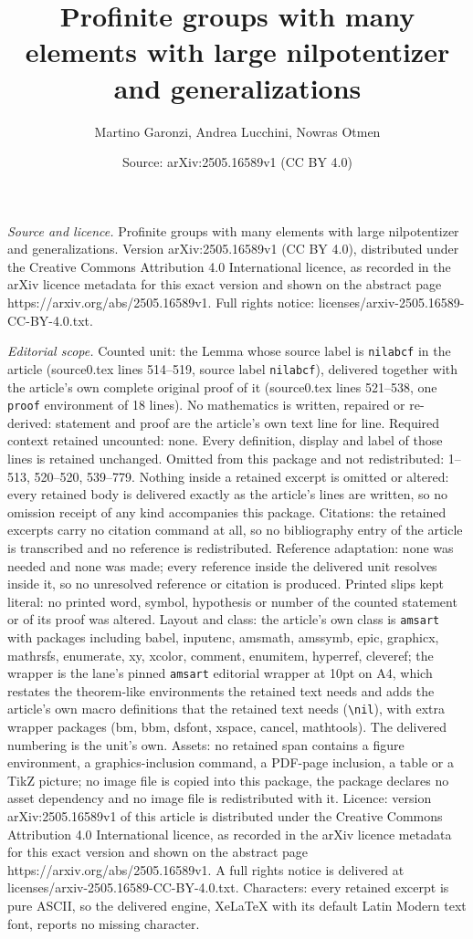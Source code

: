 \documentclass[10pt,a4paper]{amsart}
\title[Profinite groups with many elements with large nilpotentizer]{Profinite groups with many elements with large nilpotentizer and generalizations}
\author{Martino Garonzi, Andrea Lucchini, Nowras Otmen}
\date{Source: arXiv:2505.16589v1 (CC BY 4.0)}
\begin{document}
\maketitle

\noindent\emph{Source and licence.} Profinite groups with many elements with large nilpotentizer and generalizations. Version arXiv:2505.16589v1 (CC BY 4.0), distributed under the Creative Commons Attribution 4.0 International licence, as recorded in the arXiv licence metadata for this exact version and shown on the abstract page https://arxiv.org/abs/2505.16589v1. Full rights notice: licenses/arxiv-2505.16589-CC-BY-4.0.txt.\par\smallskip

\noindent\textit{Editorial scope.} Counted unit: the Lemma whose source label is \texttt{nilabcf} in the article (source0.tex lines 514--519, source label \texttt{nilabcf}), delivered together with the article's own complete original proof of it (source0.tex lines 521--538, one \texttt{proof} environment of 18 lines). No mathematics is written, repaired or re-derived: statement and proof are the article's own text line for line. Required context retained uncounted: none. Every definition, display and label of those lines is retained unchanged. Omitted from this package and not redistributed: 1--513, 520--520, 539--779. Nothing inside a retained excerpt is omitted or altered: every retained body is delivered exactly as the article's lines are written, so no omission receipt of any kind accompanies this package. Citations: the retained excerpts carry no citation command at all, so no bibliography entry of the article is transcribed and no reference is redistributed. Reference adaptation: none was needed and none was made; every reference inside the delivered unit resolves inside it, so no unresolved reference or citation is produced. Printed slips kept literal: no printed word, symbol, hypothesis or number of the counted statement or of its proof was altered. Layout and class: the article's own class is \texttt{amsart} with packages including babel, inputenc, amsmath, amssymb, epic, graphicx, mathrsfs, enumerate, xy, xcolor, comment, enumitem, hyperref, cleveref; the wrapper is the lane's pinned \texttt{amsart} editorial wrapper at 10pt on A4, which restates the theorem-like environments the retained text needs and adds the article's own macro definitions that the retained text needs (\texttt{\textbackslash nil}), with extra wrapper packages (bm, bbm, dsfont, xspace, cancel, mathtools). The delivered numbering is the unit's own. Assets: no retained span contains a figure environment, a graphics-inclusion command, a PDF-page inclusion, a table or a TikZ picture; no image file is copied into this package, the package declares no asset dependency and no image file is redistributed with it. Licence: version arXiv:2505.16589v1 of this article is distributed under the Creative Commons Attribution 4.0 International licence, as recorded in the arXiv licence metadata for this exact version and shown on the abstract page https://arxiv.org/abs/2505.16589v1. A full rights notice is delivered at licenses/arxiv-2505.16589-CC-BY-4.0.txt. Characters: every retained excerpt is pure ASCII, so the delivered engine, XeLaTeX with its default Latin Modern text font, reports no missing character.
\end{document}

